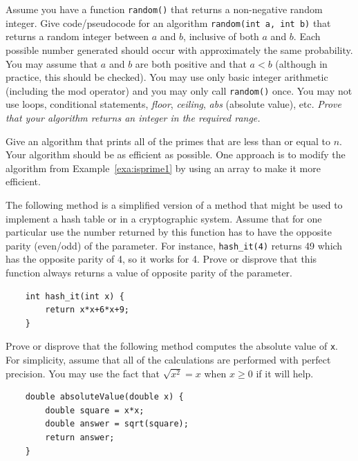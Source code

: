 \begin{pro}
Assume you have a function \verb+random()+ that returns a non-negative random integer.
Give code/pseudocode for an algorithm \verb+random(int a, int b)+ that returns a random integer 
between $a$ and $b$, inclusive of both $a$ and $b$.  
Each possible number generated should occur with approximately the same probability.
You may assume that $a$ and $b$ are both positive and that $a<b$ (although in practice, this should be checked).  
You may use only basic integer arithmetic (including the mod operator) and you may only call  \verb+random()+ once.
You may not use loops, conditional statements,  {\em floor}, {\em ceiling}, {\em abs} (absolute value), etc.
{\em Prove that your algorithm returns an integer in the required range.}
\end{pro}

\begin{pro}
Give an algorithm that prints
all of the primes that are less than or equal to $n$.  
Your algorithm should be as efficient as possible.
One approach is to modify the algorithm from Example~\ref{exa:isprime1} 
by using an array to make it more efficient.
\end{pro}

\begin{pro}
The following method is a simplified version of a method that might be used to 
implement a hash table or in a cryptographic system. 
Assume that for one particular use the number returned by this function
has to have the opposite parity (even/odd) of the parameter.  
For instance, \verb+hash_it(4)+ returns 49 which has the opposite 
parity of 4, so it works for 4.
Prove or disprove that this function always returns a value of opposite parity of the parameter.
\begin{verbatim}
    int hash_it(int x) {
        return x*x+6*x+9;
    }
\end{verbatim}
\end{pro}

\begin{pro}\label{pro:ab1}
Prove or disprove that the following method computes the absolute value of \verb+x+.
For simplicity, assume that all of the calculations are performed with perfect precision.
You may use the fact that $\sqrt{x^2}=x$ when $x\geq 0$ if it will help.
\begin{lstlisting}
    double absoluteValue(double x) {
        double square = x*x;
        double answer = sqrt(square);
        return answer;
    }
\end{lstlisting}
\end{pro}


